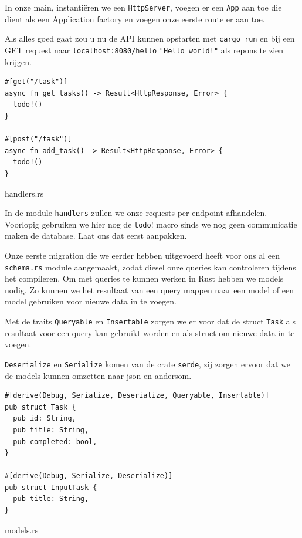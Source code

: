 In onze main, instantiëren we een \texttt{HttpServer}, voegen er een
\texttt{App} aan toe die dient als een
Application factory en voegen onze eerste route er aan toe.

Als alles goed gaat zou u nu de API kunnen opstarten met \texttt{cargo run} en bij een
GET request naar \texttt{localhost:8080/hello} \texttt{"Hello world!"} als repons 
te zien krijgen.

\begin{listing}[h]
\begin{verbatim}
#[get("/task")]
async fn get_tasks() -> Result<HttpResponse, Error> {
  todo!()
}

#[post("/task")]
async fn add_task() -> Result<HttpResponse, Error> {
  todo!()
}
\end{verbatim}
\caption{handlers.rs}
\end{listing}

In de module \texttt{handlers} zullen we onze requests per endpoint afhandelen. Voorlopig
gebruiken we hier nog de \texttt{todo}! macro sinds we nog geen communicatie maken de
database. Laat ons dat eerst aanpakken.

Onze eerste migration die we eerder hebben uitgevoerd heeft voor ons al een
\texttt{schema.rs} module aangemaakt, zodat diesel onze queries kan controleren tijdens
het compileren. Om met queries te kunnen werken in Rust hebben we models nodig. Zo kunnen we het
resultaat van een query mappen naar een model of een model gebruiken voor nieuwe data in te voegen.

Met de traits \texttt{Queryable} en \texttt{Insertable} zorgen we er voor dat de
struct \texttt{Task} als resultaat voor een query kan gebruikt worden en als struct om
nieuwe data in te voegen.

\texttt{Deserialize} en \texttt{Serialize} komen van de crate
\texttt{serde}, zij zorgen ervoor dat we de models kunnen omzetten naar json en andersom.

\clearpage

\begin{listing}[h]
\begin{verbatim}
#[derive(Debug, Serialize, Deserialize, Queryable, Insertable)]
pub struct Task {
  pub id: String,
  pub title: String,
  pub completed: bool,
}

#[derive(Debug, Serialize, Deserialize)]
pub struct InputTask {
  pub title: String,
}
\end{verbatim}
\caption{models.rs}
\end{listing}

